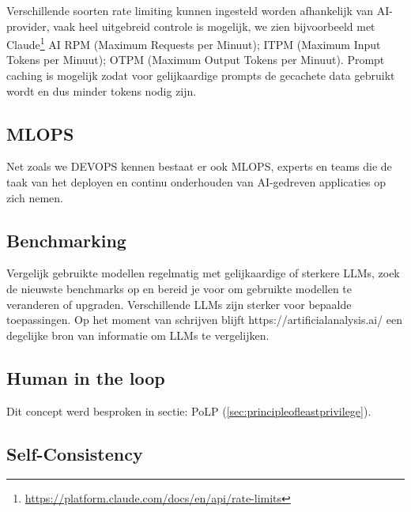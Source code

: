 Verschillende soorten rate limiting kunnen ingesteld worden afhankelijk van AI-provider, vaak heel uitgebreid controle is mogelijk, we zien bijvoorbeeld met Claude\footnote{\href{https://platform.claude.com/docs/en/api/rate-limits}{https://platform.claude.com/docs/en/api/rate-limits}} AI RPM (Maximum Requests per Minuut); ITPM (Maximum Input Tokens per Minuut); OTPM (Maximum Output Tokens per Minuut). Prompt caching is mogelijk zodat voor gelijkaardige prompts de gecachete data gebruikt wordt en dus minder tokens nodig zijn.


\subsection{MLOPS}
\label{ssec:mlops}

Net zoals we DEVOPS kennen bestaat er ook MLOPS, experts en teams die de taak van het deployen en continu onderhouden van AI-gedreven applicaties op zich nemen.

\subsection{Benchmarking}
\label{ssec:benchmarking}
Vergelijk gebruikte modellen regelmatig met gelijkaardige of sterkere LLMs, zoek de nieuwste benchmarks op en bereid je voor om gebruikte modellen te veranderen of upgraden. Verschillende LLMs zijn sterker voor bepaalde toepassingen. Op het moment van schrijven blijft https://artificialanalysis.ai/ een degelijke bron van informatie om LLMs te vergelijken.

\subsection{Human in the loop}
\label{ssec:humanintheloop}
Dit concept werd besproken in sectie: PoLP (\ref{sec:principleofleastprivilege}).

\subsection{Self-Consistency}
\label{ssec:selfconsistency}

